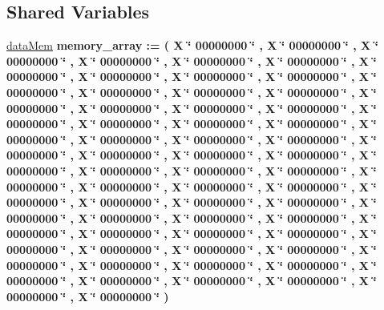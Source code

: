 \subsection*{\-Shared \-Variables}
 \begin{DoxyCompactItemize}
\item 
\hypertarget{classdata__memory_1_1behavioral_a2600aba194e7d93337116c95534d00ac}{\hyperlink{classdata__memory_1_1behavioral_a2600aba194e7d93337116c95534d00ac}{data\-Mem} {\bfseries memory\-\_\-array  \-:=  (  \-X \char`\"{} 00000000 \char`\"{} ,  \-X \char`\"{} 00000000 \char`\"{} ,  \-X \char`\"{} 00000000 \char`\"{} ,  \-X \char`\"{} 00000000 \char`\"{} ,  \-X \char`\"{} 00000000 \char`\"{} ,  \-X \char`\"{} 00000000 \char`\"{} ,  \-X \char`\"{} 00000000 \char`\"{} ,  \-X \char`\"{} 00000000 \char`\"{} ,  \-X \char`\"{} 00000000 \char`\"{} ,  \-X \char`\"{} 00000000 \char`\"{} ,  \-X \char`\"{} 00000000 \char`\"{} ,  \-X \char`\"{} 00000000 \char`\"{} ,  \-X \char`\"{} 00000000 \char`\"{} ,  \-X \char`\"{} 00000000 \char`\"{} ,  \-X \char`\"{} 00000000 \char`\"{} ,  \-X \char`\"{} 00000000 \char`\"{} ,  \-X \char`\"{} 00000000 \char`\"{} ,  \-X \char`\"{} 00000000 \char`\"{} ,  \-X \char`\"{} 00000000 \char`\"{} ,  \-X \char`\"{} 00000000 \char`\"{} ,  \-X \char`\"{} 00000000 \char`\"{} ,  \-X \char`\"{} 00000000 \char`\"{} ,  \-X \char`\"{} 00000000 \char`\"{} ,  \-X \char`\"{} 00000000 \char`\"{} ,  \-X \char`\"{} 00000000 \char`\"{} ,  \-X \char`\"{} 00000000 \char`\"{} ,  \-X \char`\"{} 00000000 \char`\"{} ,  \-X \char`\"{} 00000000 \char`\"{} ,  \-X \char`\"{} 00000000 \char`\"{} ,  \-X \char`\"{} 00000000 \char`\"{} ,  \-X \char`\"{} 00000000 \char`\"{} ,  \-X \char`\"{} 00000000 \char`\"{} ,  \-X \char`\"{} 00000000 \char`\"{} ,  \-X \char`\"{} 00000000 \char`\"{} ,  \-X \char`\"{} 00000000 \char`\"{} ,  \-X \char`\"{} 00000000 \char`\"{} ,  \-X \char`\"{} 00000000 \char`\"{} ,  \-X \char`\"{} 00000000 \char`\"{} ,  \-X \char`\"{} 00000000 \char`\"{} ,  \-X \char`\"{} 00000000 \char`\"{} ,  \-X \char`\"{} 00000000 \char`\"{} ,  \-X \char`\"{} 00000000 \char`\"{} ,  \-X \char`\"{} 00000000 \char`\"{} ,  \-X \char`\"{} 00000000 \char`\"{} ,  \-X \char`\"{} 00000000 \char`\"{} ,  \-X \char`\"{} 00000000 \char`\"{} ,  \-X \char`\"{} 00000000 \char`\"{} ,  \-X \char`\"{} 00000000 \char`\"{} ,  \-X \char`\"{} 00000000 \char`\"{} ,  \-X \char`\"{} 00000000 \char`\"{} ,  \-X \char`\"{} 00000000 \char`\"{} ,  \-X \char`\"{} 00000000 \char`\"{} ,  \-X \char`\"{} 00000000 \char`\"{} ,  \-X \char`\"{} 00000000 \char`\"{} ,  \-X \char`\"{} 00000000 \char`\"{} ,  \-X \char`\"{} 00000000 \char`\"{} ,  \-X \char`\"{} 00000000 \char`\"{} ,  \-X \char`\"{} 00000000 \char`\"{} ,  \-X \char`\"{} 00000000 \char`\"{} ,  \-X \char`\"{} 00000000 \char`\"{} ,  \-X \char`\"{} 00000000 \char`\"{} ,  \-X \char`\"{} 00000000 \char`\"{} ,  \-X \char`\"{} 00000000 \char`\"{} ,  \-X \char`\"{} 00000000 \char`\"{}  ) } }\label{classdata__memory_1_1behavioral_a2600aba194e7d93337116c95534d00ac}

\end{DoxyCompactItemize}


